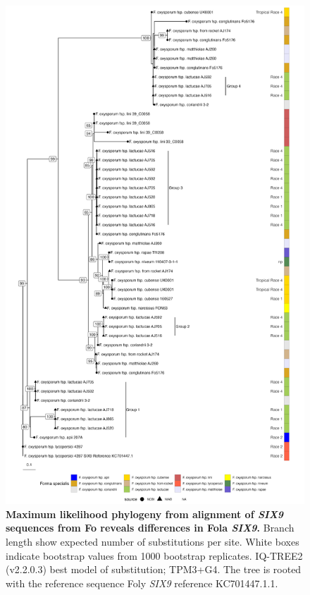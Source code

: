 \begin{figure}[htp!]
    \centering
    \includegraphics[width=12cm]{Figures/lactucaeSIX9tree.png}
    \captionsetup{width=\textwidth}
    \caption[Maximum likelihood phylogeny from alignment of \textit{SIX8} sequences from \acl{Fo} reveals differences in \acl{Fola} \textit{SIX9}.]{\textbf{Maximum likelihood phylogeny from alignment of \textit{SIX9} sequences from \acf{Fo} reveals differences in \acf{Fola} \textit{SIX9}.}  Branch length show expected number of substitutions per site. White boxes indicate bootstrap values from 1000 bootstrap replicates. IQ-TREE2 (v2.2.0.3) best model of substitution; TPM3+G4. The tree is rooted with the reference sequence \ac{Foly} \textit{SIX9} reference KC701447.1.1.}
    \label{fig:lactucae-six9}
\end{figure}

